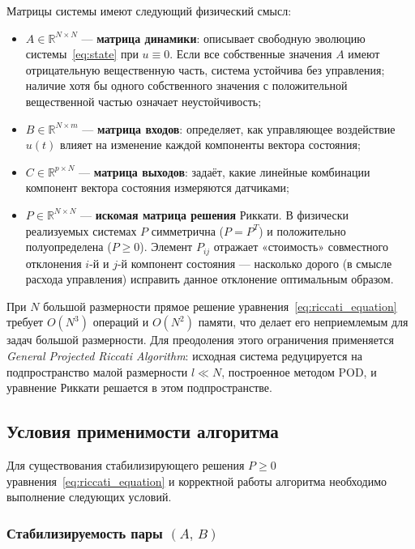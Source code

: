 \documentclass[12pt, a4paper, oneside]{extarticle}
\begin{document}
Матрицы системы имеют следующий физический смысл:
\begin{itemize}
    \item $A \in \mathbb{R}^{N \times N}$ --- \textbf{матрица динамики}: описывает
    свободную эволюцию системы~\eqref{eq:state} при $u \equiv 0$. Если все
    собственные значения $A$ имеют отрицательную вещественную часть, система
    устойчива без управления; наличие хотя бы одного собственного значения с
    положительной вещественной частью означает неустойчивость;

    \item $B \in \mathbb{R}^{N \times m}$ --- \textbf{матрица входов}: определяет,
    как управляющее воздействие $u(t)$ влияет на изменение каждой компоненты
    вектора состояния;

    \item $C \in \mathbb{R}^{p \times N}$ --- \textbf{матрица выходов}: задаёт,
    какие линейные комбинации компонент вектора состояния измеряются датчиками;

    \item $P \in \mathbb{R}^{N \times N}$ --- \textbf{искомая матрица решения}
    Риккати. В физически реализуемых системах $P$ симметрична ($P = P^T$) и
    положительно полуопределена ($P \geq 0$). Элемент $P_{ij}$ отражает
    «стоимость» совместного отклонения $i$-й и $j$-й компонент состояния ---
    насколько дорого (в смысле расхода управления) исправить данное отклонение
    оптимальным образом.
\end{itemize}

При $N$ большой размерности прямое решение уравнения~\eqref{eq:riccati_equation}
требует $O(N^3)$ операций и $O(N^2)$ памяти, что делает его неприемлемым для
задач большой размерности. Для преодоления этого ограничения применяется
\textit{General Projected Riccati Algorithm}: исходная система редуцируется на
подпространство малой размерности $l \ll N$, построенное методом POD, и
уравнение Риккати решается в этом подпространстве.

\subsection{Условия применимости алгоритма}

Для существования стабилизирующего решения $P \geq 0$
уравнения~\eqref{eq:riccati_equation} и корректной работы алгоритма необходимо
выполнение следующих условий.

\subsubsection{Стабилизируемость пары $(A,\,B)$}
\end{document}
